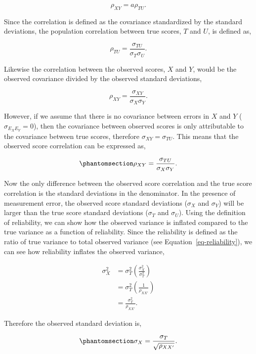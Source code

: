 \documentclass[
  letterpaper,
  DIV=11,
  numbers=noendperiod]{scrreprt}
\begin{document}
\[
\rho_{XY} = a \rho_{TU}.
\]

Since the correlation is defined as the covariance standardized by the
standard deviations, the population correlation between true scores,
\(T\) and \(U\), is defined as,

\[
\rho_{TU}=\frac{\sigma_{TU}}{\sigma_{T} \sigma_{U}}.
\]

Likewise the correlation between the observed scores, \(X\) and \(Y\),
would be the observed covariance divided by the observed standard
deviations,

\[
\rho_{XY} =\frac{\sigma_{XY}}{\sigma_{X} \sigma_{Y}}.
\]

However, if we assume that there is no covariance between errors in
\(X\) and \(Y\) (\(\sigma_{E_X E_Y} = 0\)), then the covariance between
observed scores is only attributable to the covariance between true
scores, therefore \(\sigma_{XY} = \sigma_{TU}\). This means that the
observed score correlation can be expressed as,

\begin{equation}\phantomsection\label{eq-bias}{
\rho_{XY} =\frac{\sigma_{TU}}{\sigma_{X} \sigma_{Y}}.
}\end{equation}

Now the only difference between the observed score correlation and the
true score correlation is the standard deviations in the denominator. In
the presence of measurement error, the observed score standard
deviations (\(\sigma_X\) and \(\sigma_Y\)) will be larger than the true
score standard deviations (\(\sigma_{T}\) and \(\sigma_{U}\)). Using the
definition of reliability, we can show how the observed variance is
inflated compared to the true variance as a function of reliability.
Since the reliability is defined as the ratio of true variance to total
observed variance (see Equation~\ref{eq-reliability}), we can see how
reliability inflates the observed variance,

\[\begin{aligned}
\sigma^2_X &=\sigma^2_{T} \left(\frac{\sigma^2_{X}}{\sigma^2_{T}} \right)\\[.3em]
&= \sigma^2_{T}\left(\frac{1}{\rho_{XX'}} \right)\\[.3em]
&= \frac{\sigma^2_{T}}{\rho_{XX'}}.
\end{aligned}\]

Therefore the observed standard deviation is,

\begin{equation}\phantomsection\label{eq-sd-me}{
\sigma_X = \frac{\sigma_{T}}{\sqrt{\rho_{XX'}}}.
}\end{equation}
\end{document}
